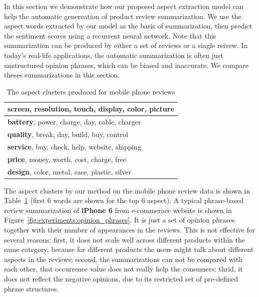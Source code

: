 In this section we demonstrate how our proposed aspect extraction model can help the automatic genereation of product review summarization. We use the aspect words extracted by our model as the basis of summarization, then predict the sentiment scores using a recurrent neural network. Note that this summarization can be produced by either a set of reviews or a single reivew. In today's real-life applications, the automatic summarization is often just unstructured opinion phrases, which can be biased and inaccurate. We compare theses summarizations in this section.

\begin{table}
\centering
\begin{tabular}{|l|}
\hline
\textbf{screen}, resolution, touch, display, color, picture \\ \hline
\textbf{battery}, power, charge, day, cable, charger \\ \hline
\textbf{quality}, break, day, build, buy, control \\ \hline
\textbf{service}, buy, check, help, website, shipping \\ \hline
\textbf{price}, money, worth, cost, charge, free \\ \hline
\textbf{design}, color, metal, case, plastic, silver \\ \hline
\end{tabular}
\caption{The aspect clusters produced for mobile phone reviews}
\label{table:clusters}
\end{table}

The aspect clusters by our method on the mobile phone review data is shown in Table~\ref{table:clusters} (first 6 words are shown for the top 6 aspect). A typical phrase-based review summarization of \textbf{iPhone 6} from e-commerace website is shown in Figure~\ref{fig:experiments:opinion_phrases}. It is just a set of opinion phrases together with their number of appearances in the reviews. This is not effective for several reasons: first, it does not scale well across different products within the same category, because for different products the users might talk about different aspects in the reviews; second, the summarizations can not be compared with each other, that occurrence value does not really help the consumers; thrid, it does not reflect the negative opinions, due to its restricted set of pre-defined phrase structures.

